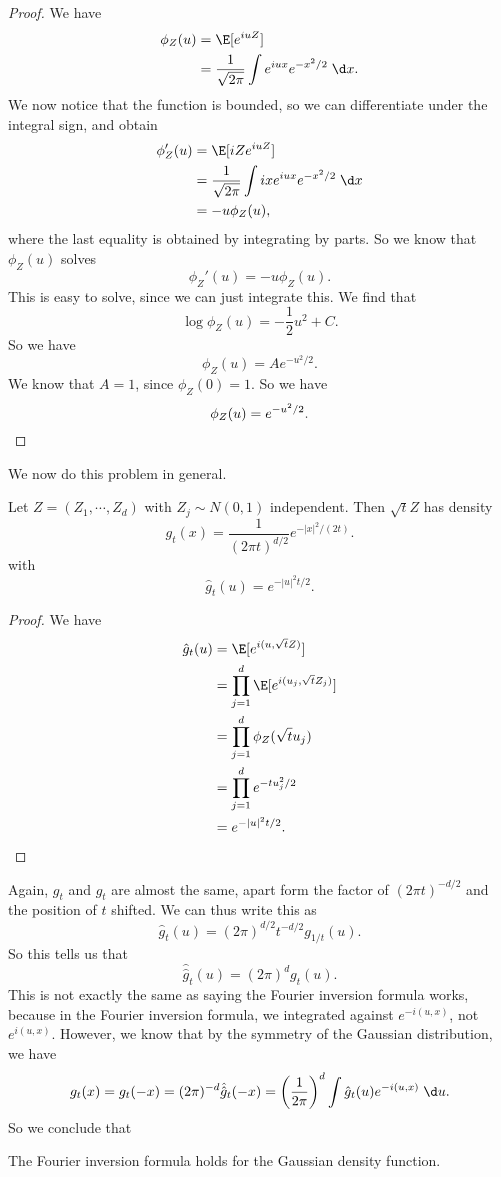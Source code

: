 \documentclass[a4paper]{article}
\begin{document}
\begin{proof}
  We have
  \begin{align*}
    \phi_Z(u) &= \E[e^{iuZ}]\\
    &= \frac{1}{\sqrt{2\pi}} \int e^{iux} e^{-x^2/2}\;\d x.
  \end{align*}
  We now notice that the function is bounded, so we can differentiate under the integral sign, and obtain
  \begin{align*}
    \phi_Z'(u) &= \E[iZ e^{iuZ}]\\
    &= \frac{1}{\sqrt{2\pi}} \int ix e^{iux} e^{-x^2/2}\;\d x\\
    &= - u\phi_Z(u),
  \end{align*}
  where the last equality is obtained by integrating by parts. So we know that $\phi_Z(u)$ solves
  \[
    \phi_Z'(u) = -u \phi_Z(u).
  \]
  This is easy to solve, since we can just integrate this. We find that
  \[
    \log \phi_Z(u) = - \frac{1}{2}u^2 + C.
  \]
  So we have
  \[
    \phi_Z(u) = A e^{-u^2/2}.
  \]
  We know that $A = 1$, since $\phi_Z(0) = 1$. So we have
  \[
    \phi_Z(u) = e^{-u^2/2}.\qedhere
  \]
\end{proof}

We now do this problem in general.
\begin{prop}
  Let $Z = (Z_1, \cdots, Z_d)$ with $Z_j \sim N(0, 1)$ independent. Then $\sqrt{t} Z$ has density
  \[
    g_t(x) = \frac{1}{(2\pi t)^{d/2}} e^{-|x|^2/(2t)}.
  \]
  with
  \[
    \hat{g}_t(u) = e^{-|u|^2 t/2}.
  \]
\end{prop}

\begin{proof}
  We have
  \begin{align*}
    \hat{g}_t(u) &= \E[e^{i(u, \sqrt{t}Z)}]\\
    &= \prod_{j = 1}^d \E[e^{i(u_j, \sqrt{t} Z_j)}]\\
    &= \prod_{j = 1}^d \phi_Z(\sqrt{t} u_j)\\
    &= \prod_{j = 1}^d e^{-t u_j^2/2}\\
    &= e^{-|u|^2 t/2}.\qedhere
  \end{align*}
\end{proof}
Again, $g_t$ and $\hat{g}_t$ are almost the same, apart form the factor of $(2\pi t)^{-d/2}$ and the position of $t$ shifted. We can thus write this as
\[
  \hat{g}_t(u) = (2\pi)^{d/2} t^{-d/2} g_{1/t} (u).
\]
So this tells us that
\[
  \hat{\hat{g}}_t(u) = (2\pi)^d g_t(u).
\]
This is not exactly the same as saying the Fourier inversion formula works, because in the Fourier inversion formula, we integrated against $e^{-i(u, x)}$, not $e^{i(u, x)}$. However, we know that by the symmetry of the Gaussian distribution, we have
\[
  g_t(x) = g_t(-x) = (2\pi)^{-d} \hat{\hat{g}}_t (-x) = \left(\frac{1}{2\pi}\right)^d \int \hat{g}_t(u) e^{-i(u, x)}\;\d u.
\]
So we conclude that
\begin{lemma}
  The Fourier inversion formula holds for the Gaussian density function.
\end{lemma}
\end{document}
